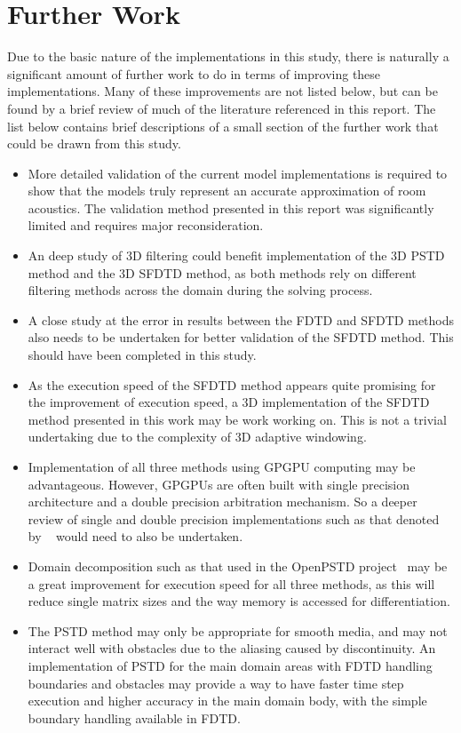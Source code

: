 \section{Further Work}
Due to the basic nature of the implementations in this study, there is naturally a significant amount of further work to do in terms of improving these implementations. Many of these improvements are not listed below, but can be found by a brief review of much of the literature referenced in this report. The list below contains brief descriptions of a small section of the further work that could be drawn from this study.
\begin{itemize}
\item More detailed validation of the current model implementations is required to show that the models truly represent an accurate approximation of room acoustics. The validation method presented in this report was significantly limited and requires major reconsideration.
\item An deep study of 3D filtering could benefit implementation of the 3D PSTD method and the 3D SFDTD method, as both methods rely on different filtering methods across the domain during the solving process.
\item A close study at the error in results between the FDTD and SFDTD methods also needs to be undertaken for better validation of the SFDTD method. This should have been completed in this study.
\item As the execution speed of the SFDTD method appears quite promising for the improvement of execution speed, a 3D implementation of the SFDTD method presented in this work may be work working on. This is not a trivial undertaking due to the complexity of 3D adaptive windowing.
\item Implementation of all three methods using GPGPU computing may be advantageous. However, GPGPUs are often built with single precision architecture and a double precision arbitration mechanism. So a deeper review of single and double precision implementations such as that denoted by ~\cite{Murphy2014} would need to also be undertaken.
\item Domain decomposition such as that used in the OpenPSTD project~\cite{Hornikx2016} may be a great improvement for execution speed for all three methods, as this will reduce single matrix sizes and the way memory is accessed for differentiation.
\item The PSTD method may only be appropriate for smooth media, and may not interact well with obstacles due to the aliasing caused by discontinuity. An implementation of PSTD for the main domain areas with FDTD handling boundaries and obstacles may provide a way to have faster time step execution and higher accuracy in the main domain body, with the simple boundary handling available in FDTD.
\end{itemize}